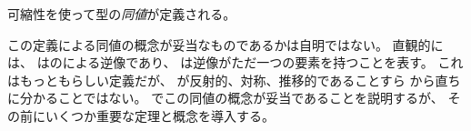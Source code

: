 \documentclass[index]{subfiles}
\begin{document}


可縮性を使って型の\emph{同値}が定義される。





この定義による同値の概念が妥当なものであるかは自明ではない。
直観的には、
はのによる逆像であり、
は逆像がただ一つの要素を持つことを表す。
これはもっともらしい定義だが、
\myInlineMath{\myEquiv}が反射的、対称、推移的であることすら
から直ちに分かることではない。
でこの同値の概念が妥当であることを説明するが、
その前にいくつか重要な定理と概念を導入する。
\end{document}
